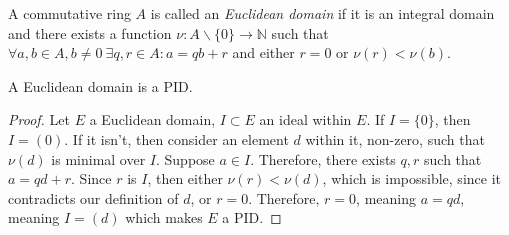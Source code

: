 
\begin{definition}
  A commutative ring $A$ is called an \emph{Euclidean domain} if it is an integral domain and there exists a function $\nu: A \smallsetminus \{0\} \to \mathbb{N}$ such that $\forall a, b \in A, b \neq 0 \ \exists q, r \in A: a = qb + r$ and either $r = 0$ or $\nu(r) < \nu(b)$.
\end{definition}

\begin{theorem*}
  A Euclidean domain is a PID. 
\end{theorem*}
\begin{proof}
  Let $E$ a Euclidean domain, $I \subset E$ an ideal within $E$. If $I = \{0\}$, then $I = (0)$. If it isn't, then consider an element $d$ within it, non-zero, such that $\nu(d)$ is minimal over $I$. Suppose $a \in I$. Therefore, there exists $q, r$ such that $a = qd + r$. Since $r$ is $I$, then either $\nu(r) < \nu(d)$, which is impossible, since it contradicts our definition of $d$, or $r = 0$. Therefore, $r = 0$, meaning $a = qd$, meaning $I = (d)$ which makes $E$ a PID. 
\end{proof}

